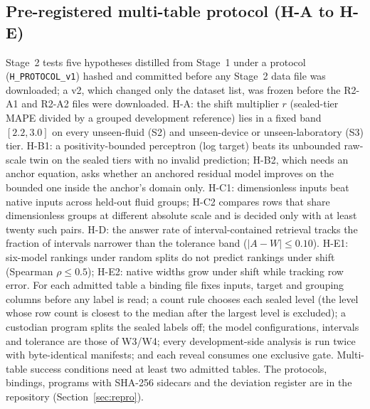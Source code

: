 \documentclass[11pt,a4paper]{article}
\begin{document}
\subsection{Pre-registered multi-table protocol (H-A to H-E)}
\label{sec:hprotocol}
Stage~2 tests five hypotheses distilled from Stage~1 under a protocol
(\texttt{H\_PROTOCOL\_v1}) hashed and committed before any Stage~2 data file
was downloaded; a v2, which changed only the dataset list, was frozen before
the R2-A1 and R2-A2 files were downloaded. H-A: the shift multiplier
$r$ (sealed-tier MAPE divided by a grouped development reference) lies in a
fixed band $[2.2, 3.0]$ on every unseen-fluid (S2) and unseen-device or
unseen-laboratory (S3) tier. \mbox{H-B1}: a positivity-bounded perceptron (log target)
beats its unbounded raw-scale twin on the sealed tiers with no invalid
prediction; \mbox{H-B2}, which needs an anchor equation, asks whether an anchored
residual model improves on the bounded one inside the anchor's domain only.
\mbox{H-C1}: dimensionless inputs beat native inputs across held-out fluid groups;
\mbox{H-C2} compares rows that share dimensionless groups at different absolute
scale and is decided only with at least twenty such pairs. H-D: the answer rate of interval-contained retrieval tracks the
fraction of intervals narrower than the tolerance band ($|A-W|\le 0.10$). \mbox{H-E1}:
six-model rankings under random splits do not predict rankings under shift
(Spearman $\rho\le 0.5$); \mbox{H-E2}: native widths grow under shift while tracking
row error. For each admitted table a binding file fixes inputs, target and
grouping columns before any label is read; a count rule chooses each sealed
level (the level whose row count is closest to the median after the largest
level is excluded); a custodian program splits the sealed labels off; the
model configurations, intervals and tolerance are those of W3/W4; every
development-side analysis is run twice with byte-identical manifests; and each
reveal consumes one exclusive gate. Multi-table success conditions need at
least two admitted tables. The protocols, bindings, programs with SHA-256
sidecars and the deviation register are in the repository
(Section~\ref{sec:repro}).
\end{document}
